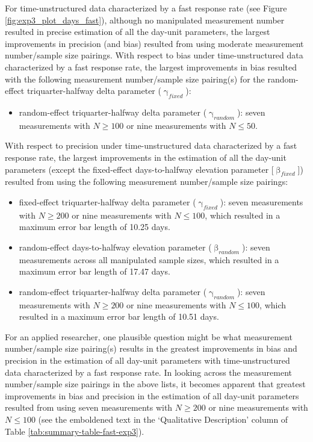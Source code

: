 \documentclass[
12pt, %
twoside,
english]{guelphthesis}
\begin{document}
For time-unstructured data characterized by a fast response rate (see Figure \ref{fig:exp3_plot_days_fast}), although no manipulated measurement number resulted in precise estimation of all the day-unit parameters, the largest improvements in precision (and bias) resulted from using moderate measurement number/sample size pairings. With respect to bias under time-unstructured data characterized by a fast response rate, the largest improvements in bias resulted with the following measurement number/sample size pairing(s) for the random-effect triquarter-halfway delta parameter (\(\upgamma_{fixed}\)):
\begin{itemize}
\tightlist
\item
  random-effect triquarter-halfway delta parameter (\(\upgamma_{random}\)): seven measurements with \(N \ge 100\) or nine measurements with \(N \le 50\).
\end{itemize}
\noindent With respect to precision under time-unstructured data characterized by a fast response rate, the largest improvements in the estimation of all the day-unit parameters (except the fixed-effect days-to-halfway elevation parameter {[}\(\upbeta_{fixed}\){]}) resulted from using the following measurement number/sample size pairings:
\begin{itemize}
\tightlist
\item
  fixed-effect triquarter-halfway delta parameter (\(\upgamma_{fixed}\)): seven measurements with \(N \ge 200\) or nine measurements with \(N \le 100\), which resulted in a maximum error bar length of 10.25 days.
\item
  random-effect days-to-halfway elevation parameter (\(\upbeta_{random}\)): seven measurements across all manipulated sample sizes, which resulted in a maximum error bar length of 17.47 days.
\item
  random-effect triquarter-halfway delta parameter (\(\upgamma_{random}\)): seven measurements with \(N \ge 200\) or nine measurements with \(N \le 100\), which resulted in a maximum error bar length of 10.51 days.
\end{itemize}
For an applied researcher, one plausible question might be what measurement number/sample size pairing(s) results in the greatest improvements in bias and precision in the estimation of all day-unit parameters with time-unstructured data characterized by a fast response rate. In looking across the measurement number/sample size pairings in the above lists, it becomes apparent that greatest improvements in bias and precision in the estimation of all day-unit parameters resulted from using seven measurements with \(N \ge 200\) or nine measurements with \(N \le 100\) (see the emboldened text in the `Qualitative Description' column of Table \ref{tab:summary-table-fast-exp3}).
\end{document}
